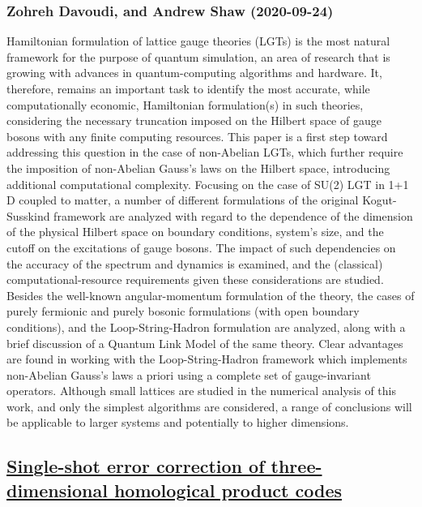 \subsubsection*{Zohreh Davoudi, and Andrew Shaw (2020-09-24)}
Hamiltonian formulation of lattice gauge theories (LGTs) is the most natural
framework for the purpose of quantum simulation, an area of research that is
growing with advances in quantum-computing algorithms and hardware. It,
therefore, remains an important task to identify the most accurate, while
computationally economic, Hamiltonian formulation(s) in such theories,
considering the necessary truncation imposed on the Hilbert space of gauge
bosons with any finite computing resources. This paper is a first step toward
addressing this question in the case of non-Abelian LGTs, which further require
the imposition of non-Abelian Gauss's laws on the Hilbert space, introducing
additional computational complexity. Focusing on the case of SU(2) LGT in 1+1 D
coupled to matter, a number of different formulations of the original
Kogut-Susskind framework are analyzed with regard to the dependence of the
dimension of the physical Hilbert space on boundary conditions, system's size,
and the cutoff on the excitations of gauge bosons. The impact of such
dependencies on the accuracy of the spectrum and dynamics is examined, and the
(classical) computational-resource requirements given these considerations are
studied. Besides the well-known angular-momentum formulation of the theory, the
cases of purely fermionic and purely bosonic formulations (with open boundary
conditions), and the Loop-String-Hadron formulation are analyzed, along with a
brief discussion of a Quantum Link Model of the same theory. Clear advantages
are found in working with the Loop-String-Hadron framework which implements
non-Abelian Gauss's laws a priori using a complete set of gauge-invariant
operators. Although small lattices are studied in the numerical analysis of
this work, and only the simplest algorithms are considered, a range of
conclusions will be applicable to larger systems and potentially to higher
dimensions.

\subsection*{\href{http://arxiv.org/abs/2009.11790v1}{Single-shot error correction of three-dimensional homological product  codes}}
